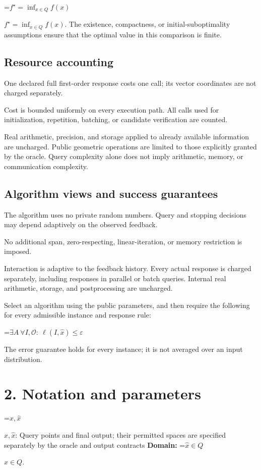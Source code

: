 \documentclass[10pt,a4paper]{article}
\newcommand{\AtlasMath}[1]{\par\begingroup\centering\setbox0=\hbox{$\displaystyle #1$}\ifdim\wd0>1.4\linewidth\typeout{ATLAS WIDE FORMULA: \the\wd0}\fi\ifdim\wd0>\linewidth\resizebox{\linewidth}{!}{\box0}\else\box0\fi\par\endgroup}
\newcommand{\AtlasInlineMath}[1]{\begingroup\setbox0=\hbox{$#1$}\ifdim\wd0>.4\linewidth\endgroup\AtlasMath{#1}\else\endgroup$#1$\fi}
\begin{document}
\AtlasInlineMath{f^\star=\inf_{x\in Q}f(x)}. The existence, compactness, or initial-suboptimality assumptions ensure that the optimal value in this comparison is finite.

\subsection{Resource accounting}
One declared full first-order response costs one call; its vector coordinates are not charged separately.

Cost is bounded uniformly on every execution path. All calls used for initialization, repetition, batching, or candidate verification are counted.

Real arithmetic, precision, and storage applied to already available information are uncharged. Public geometric operations are limited to those explicitly granted by the oracle. Query complexity alone does not imply arithmetic, memory, or communication complexity.

\subsection{Algorithm views and success guarantees}
The algorithm uses no private random numbers. Query and stopping decisions may depend adaptively on the observed feedback.

No additional span, zero-respecting, linear-iteration, or memory restriction is imposed.

Interaction is adaptive to the feedback history. Every actual response is charged separately, including responses in parallel or batch queries. Internal real arithmetic, storage, and postprocessing are uncharged.

Select an algorithm using the public parameters, and then require the following for every admissible instance and response rule:


\AtlasMath{\exists A\ \forall I,\mathcal{O}:\ \ell(I,\widehat{x})\le\varepsilon}


The error guarantee holds for every instance; it is not averaged over an input distribution.

\section{2. Notation and parameters}
\AtlasInlineMath{x,\widehat{x}}: Query points and final output; their permitted spaces are specified separately by the oracle and output contracts \textbf{Domain:} \AtlasInlineMath{\widehat{x}\in Q}.
\end{document}
